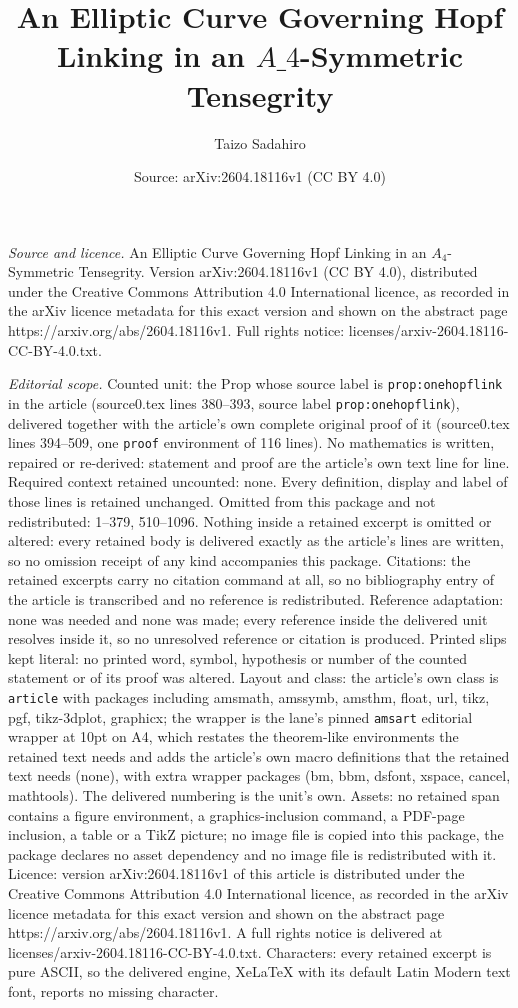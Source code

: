 \documentclass[10pt,a4paper]{amsart}
\title[An Elliptic Curve Governing Hopf Linking in an $A\_4$-Symmetr]{An Elliptic Curve Governing Hopf Linking in an $A\_4$-Symmetric Tensegrity}
\author{Taizo Sadahiro}
\date{Source: arXiv:2604.18116v1 (CC BY 4.0)}
\begin{document}
\maketitle

\noindent\emph{Source and licence.} An Elliptic Curve Governing Hopf Linking in an $A_4$-Symmetric Tensegrity. Version arXiv:2604.18116v1 (CC BY 4.0), distributed under the Creative Commons Attribution 4.0 International licence, as recorded in the arXiv licence metadata for this exact version and shown on the abstract page https://arxiv.org/abs/2604.18116v1. Full rights notice: licenses/arxiv-2604.18116-CC-BY-4.0.txt.\par\smallskip

\noindent\textit{Editorial scope.} Counted unit: the Prop whose source label is \texttt{prop:onehopflink} in the article (source0.tex lines 380--393, source label \texttt{prop:onehopflink}), delivered together with the article's own complete original proof of it (source0.tex lines 394--509, one \texttt{proof} environment of 116 lines). No mathematics is written, repaired or re-derived: statement and proof are the article's own text line for line. Required context retained uncounted: none. Every definition, display and label of those lines is retained unchanged. Omitted from this package and not redistributed: 1--379, 510--1096. Nothing inside a retained excerpt is omitted or altered: every retained body is delivered exactly as the article's lines are written, so no omission receipt of any kind accompanies this package. Citations: the retained excerpts carry no citation command at all, so no bibliography entry of the article is transcribed and no reference is redistributed. Reference adaptation: none was needed and none was made; every reference inside the delivered unit resolves inside it, so no unresolved reference or citation is produced. Printed slips kept literal: no printed word, symbol, hypothesis or number of the counted statement or of its proof was altered. Layout and class: the article's own class is \texttt{article} with packages including amsmath, amssymb, amsthm, float, url, tikz, pgf, tikz-3dplot, graphicx; the wrapper is the lane's pinned \texttt{amsart} editorial wrapper at 10pt on A4, which restates the theorem-like environments the retained text needs and adds the article's own macro definitions that the retained text needs (none), with extra wrapper packages (bm, bbm, dsfont, xspace, cancel, mathtools). The delivered numbering is the unit's own. Assets: no retained span contains a figure environment, a graphics-inclusion command, a PDF-page inclusion, a table or a TikZ picture; no image file is copied into this package, the package declares no asset dependency and no image file is redistributed with it. Licence: version arXiv:2604.18116v1 of this article is distributed under the Creative Commons Attribution 4.0 International licence, as recorded in the arXiv licence metadata for this exact version and shown on the abstract page https://arxiv.org/abs/2604.18116v1. A full rights notice is delivered at licenses/arxiv-2604.18116-CC-BY-4.0.txt. Characters: every retained excerpt is pure ASCII, so the delivered engine, XeLaTeX with its default Latin Modern text font, reports no missing character.
\end{document}
